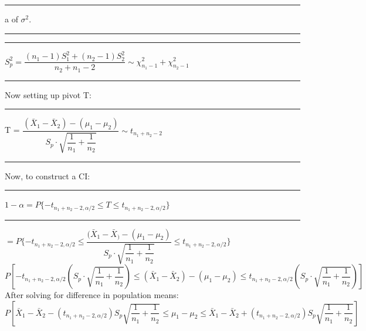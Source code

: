 \documentclass[]{article}
\begin{document}
\newline\Large\rule{3.0cm}{0pt}  a    of $\sigma^2$.
\newline\Large\rule{3.0cm}{0pt} 
\newline\Large\rule{3.0cm}{0pt} $S^2_p = \dfrac{(n_1 -1)S^2_1 + (n_2 - 1) S^2_2}{n_2 + n_1- 2} \sim \chi^2_{n_1 -1} + \chi^2_{n_2 -1}$ 
\newline\newline\Large\rule{3.0cm}{0pt} Now setting up pivot T:
\newline\newline\Large\rule{3.0cm}{0pt} T = $\dfrac{  (  \bar{X}_1 - \bar{X}_2 )  -  (\mu_1 - \mu_2)   }{S_p \cdot \sqrt{\dfrac{1}{n_1} + \dfrac{1}{n_2} }} \sim t_{n_1 + n_2 - 2}$
\newline
\newline\newline\Large\rule{3.0cm}{0pt}  Now, to construct a CI:
\newline
\newline\Large\rule{3.0cm}{0pt} $1 - \alpha = P \{ -t_{n_1 + n_2 - 2, \alpha / 2} \le T \le t_{n_1 + n_2 - 2, \alpha /2} \}$ 
\newline
\newline
\newline\Large\rule{2.3cm}{0pt} $ = P \{ -t_{n_1 + n_2 - 2, \alpha / 2} \le \dfrac{ ( \bar{X}_1 - \bar{X}_  ) - (\mu_1 - \mu_2)   }{S_p \cdot \sqrt{\dfrac{1}{n_1} + \dfrac{1}{n_2} }} \le t_{n_1 + n_2 - 2, \alpha /2} \}$
\newline
\newline
\newline
$P \left[  -t_{n_1 + n_2 - 2, \alpha / 2} \left( S_p \cdot \sqrt{\dfrac{1}{n_1} + \dfrac{1}{n_2}} \right) \le  (  \bar{X}_1 - \bar{X}_2 )  -  (\mu_1 - \mu_2) \le t_{n_1 + n_2 - 2, \alpha /2} \left( S_p \cdot \sqrt{\dfrac{1}{n_1} + \dfrac{1}{n_2}} \right)  \right]$
\newline
\newline
\newline After solving for difference in population means:
\newline
\newline$P\left[  \bar{X}_1 - \bar{X}_2 - ( t_{n_1 + n_2 - 2, \alpha / 2} ) S_p \sqrt{\dfrac{1}{n_1} + \dfrac{1}{n_2}}  \le  \mu_1 - \mu_2 \le  \bar{X}_1 - \bar{X}_2  +  (t_{n_1 + n_2 - 2, \alpha /2}) S_p \sqrt{\dfrac{1}{n_1} + \dfrac{1}{n_2}} \right]$
\newline
\newline\newline\newline
\end{document}
